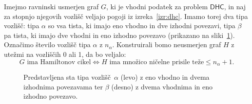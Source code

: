 \documentclass[12pt,a4paper,twoside]{article}
\theoremstyle{definition} %
\theoremstyle{plain} %
\numberwithin{equation}{section}  %
\newcommand{\DHC}{\ensuremath{\mathsf{DHC}}}
\begin{document}
Imejmo ravninski usmerjen graf $G$, ki je vhodni podatek za problem $\DHC$, in naj za stopnjo njegovih vozlišč veljajo pogoji iz izreka~\ref{izr:dhc}. Imamo torej dva tipa vozlišč: tipa $\alpha$ so vsa tista, ki imajo eno vhodno in dve izhodni povezavi, tipa $\beta$ pa tista, ki imajo dve vhodni in eno izhodno povezavo (prikazano na sliki~\ref{fig:np-alfa-beta-vozlisce}). Označimo število vozlišč tipa $\alpha$ z $n_\alpha$. Konstruirali bomo neusmerjen graf $H$ z utežmi na vozliščih 0 ali 1, da bo veljalo:
\[ G\text{ ima Hamiltonov cikel} \iff H \text{ ima množico ničelne prisile teže} \leq n_\alpha + 1 .\]
\begin{figure}[h]
    \centering
    \begin{subfigure}{0.5\textwidth}
        \centering
    \end{subfigure}
    \begin{subfigure}{0.49\textwidth}
        \centering
    \end{subfigure}
    \caption{Predstavljena sta tipa vozlišč~$\alpha$ (levo) z eno vhodno in dvema izhodnima povezavama  ter $\beta$ (desno) z dvema vhodnima in eno izhodno povezavo.}
    \label{fig:np-alfa-beta-vozlisce}
\end{figure}
\end{document}
